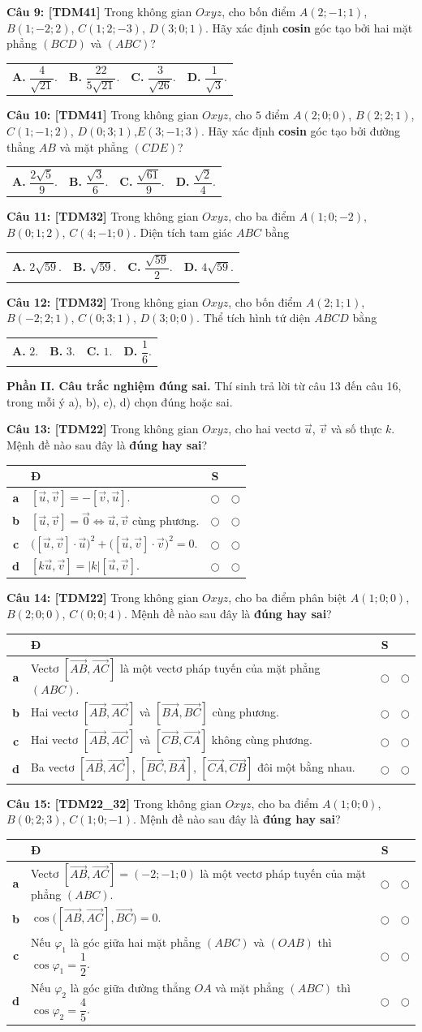 \documentclass[12pt,a4paper]{article}
\makeatletter
\newcommand{\question}[2][TDM31]{%
  \par\noindent\textbf{\textcolor{sectionpurple}{Câu #2:} \textcolor{noteborder}{[#1]}}\enspace}
\newcommand{\answerlabel}[1]{\textbf{\textcolor{sectionpurple}{#1.}}}
\newcommand{\fourchoices}[4]{%
 \par\nobreak\vspace{1pt}\begin{tabular*}{\linewidth}{@{}l@{\extracolsep{\fill}}lll@{}}
 \answerlabel{A} #1 & \answerlabel{B} #2 & \answerlabel{C} #3 & \answerlabel{D} #4
 \end{tabular*}\par}
\newcommand{\tfbox}[4]{%
\begin{notebox}\renewcommand{\arraystretch}{1.17}\setlength{\tabcolsep}{4pt}
\begin{tabularx}{\linewidth}{|>{\bfseries\color{sectionpurple}}c|>{\raggedright\arraybackslash}X|c|c|}
\hline\multicolumn{2}{|c|}{\textbf{\textcolor{sectionpurple}{Mệnh đề}}}&
\textbf{\textcolor{sectionpurple}{Đ}}&\textbf{\textcolor{sectionpurple}{S}}\\\hline
 a & #1 & $\bigcirc$ & $\bigcirc$ \\ \hline
 b & #2 & $\bigcirc$ & $\bigcirc$ \\ \hline
 c & #3 & $\bigcirc$ & $\bigcirc$ \\ \hline
 d & #4 & $\bigcirc$ & $\bigcirc$ \\ \hline
\end{tabularx}\end{notebox}}
\newcommand{\parttwo}[2]{\par\addvspace{2pt}\textbf{Phần II. Câu trắc nghiệm đúng sai.} Thí sinh trả lời từ câu #1 đến câu #2, trong mỗi ý a), b), c), d) chọn đúng hoặc sai.\par}
\makeatother
\begin{document}
\question[TDM41]{9} Trong không gian $Oxyz$, cho bốn điểm $A(2;-1;1)$, $B(1;-2;2)$, $C(1;2;-3)$, $D(3;0;1)$. Hãy xác định \textbf{cosin} góc tạo bởi hai mặt phẳng $(BCD)$ và $(ABC)$?
\fourchoices{$\dfrac4{\sqrt{21}}$.}{$\dfrac{22}{5\sqrt{21}}$.}{$\dfrac3{\sqrt{26}}$.}{$\dfrac1{\sqrt3}$.}

\question[TDM41]{10} Trong không gian $Oxyz$, cho $5$ điểm $A(2;0;0)$, $B(2;2;1)$, $C(1;-1;2)$, $D(0;3;1)$,\linebreak $E(3;-1;3)$. Hãy xác định \textbf{cosin} góc tạo bởi đường thẳng $AB$ và mặt phẳng $(CDE)$?
\fourchoices{$\dfrac{2\sqrt5}9$.}{$\dfrac{\sqrt3}6$.}{$\dfrac{\sqrt{61}}9$.}{$\dfrac{\sqrt2}4$.}

\question[TDM32]{11} Trong không gian $Oxyz$, cho ba điểm $A(1;0;-2)$, $B(0;1;2)$, $C(4;-1;0)$. Diện tích tam giác $ABC$ bằng
\fourchoices{$2\sqrt{59}$.}{$\sqrt{59}$.}{$\dfrac{\sqrt{59}}2$.}{$4\sqrt{59}$.}

\question[TDM32]{12} Trong không gian $Oxyz$, cho bốn điểm $A(2;1;1)$, $B(-2;2;1)$, $C(0;3;1)$, $D(3;0;0)$. Thể tích hình tứ diện $ABCD$ bằng
\fourchoices{$2$.}{$3$.}{$1$.}{$\dfrac16$.}

\parttwo{13}{16}
\question[TDM22]{13} Trong không gian $Oxyz$, cho hai vectơ $\vec{u}$, $\vec{v}$ và số thực $k$. Mệnh đề nào sau đây là \textbf{đúng hay sai}?
\tfbox{$[\vec{u},\vec{v}]=-[\vec{v},\vec{u}]$.}
{$[\vec{u},\vec{v}]=\vec{0}\Leftrightarrow\vec{u},\vec{v}$ cùng phương.}
{$\bigl([\vec{u},\vec{v}]\cdot\vec{u}\bigr)^2+\bigl([\vec{u},\vec{v}]\cdot\vec{v}\bigr)^2=0$.}
{$[k\vec{u},\vec{v}]=|k|[\vec{u},\vec{v}]$.}

\question[TDM22]{14} Trong không gian $Oxyz$, cho ba điểm phân biệt $A(1;0;0)$, $B(2;0;0)$, $C(0;0;4)$. Mệnh đề nào sau đây là \textbf{đúng hay sai}?
\tfbox{Vectơ $[\overrightarrow{AB},\overrightarrow{AC}]$ là một vectơ pháp tuyến của mặt phẳng $(ABC)$.}
{Hai vectơ $[\overrightarrow{AB},\overrightarrow{AC}]$ và $[\overrightarrow{BA},\overrightarrow{BC}]$ cùng phương.}
{Hai vectơ $[\overrightarrow{AB},\overrightarrow{AC}]$ và $[\overrightarrow{CB},\overrightarrow{CA}]$ không cùng phương.}
{Ba vectơ $[\overrightarrow{AB},\overrightarrow{AC}]$, $[\overrightarrow{BC},\overrightarrow{BA}]$, $[\overrightarrow{CA},\overrightarrow{CB}]$ đôi một bằng nhau.}

\question[TDM22\_32]{15} Trong không gian $Oxyz$, cho ba điểm $A(1;0;0)$, $B(0;2;3)$, $C(1;0;-1)$. Mệnh đề nào sau đây là \textbf{đúng hay sai}?
\tfbox{Vectơ $[\overrightarrow{AB},\overrightarrow{AC}]=(-2;-1;0)$ là một vectơ pháp tuyến của mặt phẳng $(ABC)$.}
{$\cos\bigl([\overrightarrow{AB},\overrightarrow{AC}],\overrightarrow{BC}\bigr)=0$.}
{Nếu $\varphi_1$ là góc giữa hai mặt phẳng $(ABC)$ và $(OAB)$ thì $\cos\varphi_1=\dfrac12$.}
{Nếu $\varphi_2$ là góc giữa đường thẳng $OA$ và mặt phẳng $(ABC)$ thì $\cos\varphi_2=\dfrac45$.}
\end{document}
